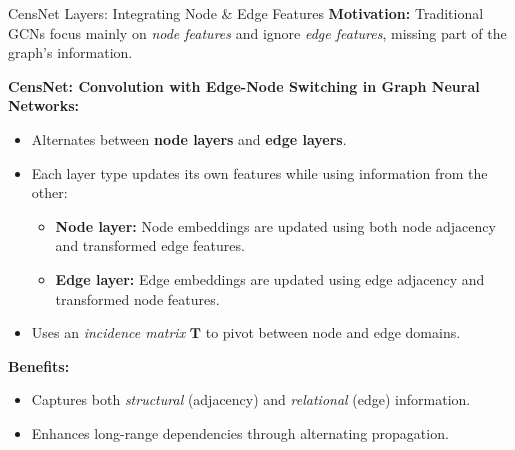 \documentclass[hyperref={colorlinks,citecolor=blue,linkcolor=blue,urlcolor=blue}]{beamer}
\begin{document}
\begin{frame}{CensNet Layers: Integrating Node \& Edge Features}
\justifying
\footnotesize
\textbf{Motivation:}  
Traditional GCNs focus mainly on \textit{node features} and ignore \textit{edge features}, missing part of the graph’s information.

\medskip
\textbf{CensNet: Convolution with Edge-Node Switching in Graph Neural Networks:}
\begin{itemize}
    \item Alternates between \textbf{node layers} and \textbf{edge layers}.
    \item Each layer type updates its own features while using information from the other:
    \begin{itemize}
        \item \footnotesize \textbf{Node layer:} Node embeddings are updated using both node adjacency and transformed edge features.
        \item \footnotesize \textbf{Edge layer:} Edge embeddings are updated using edge adjacency and transformed node features.
    \end{itemize}
    \item Uses an \textit{incidence matrix} \( \mathbf{T} \) to pivot between node and edge domains.
\end{itemize}

\medskip
\textbf{Benefits:}
\begin{itemize}
    \item Captures both \textit{structural} (adjacency) and \textit{relational} (edge) information.
    \item Enhances long-range dependencies through alternating propagation.
\end{itemize}
\end{frame}
\end{document}
